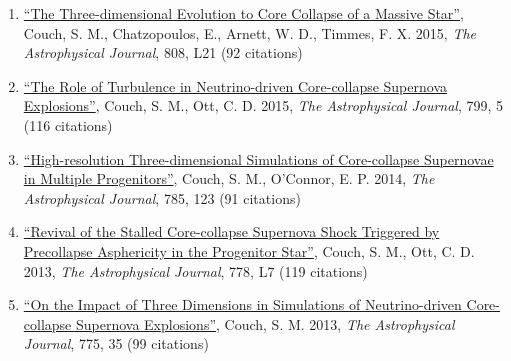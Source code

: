 \documentclass[12pt]{article}
\begin{document}
\begin{enumerate}
  \item \href{https://ui.adsabs.harvard.edu/#abs/2015ApJ...808L..21C/abstract}{``The Three-dimensional Evolution to Core Collapse of a Massive Star''}, Couch, S. M., Chatzopoulos, E., Arnett, W. D., Timmes, F. X. 2015, {\itshape The Astrophysical Journal}, 808, L21 (92 citations)
  
  \item \href{https://ui.adsabs.harvard.edu/#abs/2015ApJ...799....5C/abstract}{``The Role of Turbulence in Neutrino-driven Core-collapse Supernova Explosions''}, Couch, S. M., Ott, C. D. 2015, {\itshape The Astrophysical Journal}, 799, 5 (116 citations)

  \item \href{https://ui.adsabs.harvard.edu/#abs/2014ApJ...785..123C/abstract}{``High-resolution Three-dimensional Simulations of Core-collapse Supernovae in Multiple Progenitors''}, Couch, S. M., O'Connor, E. P. 2014, {\itshape The Astrophysical Journal}, 785, 123 (91 citations)

  \item \href{https://ui.adsabs.harvard.edu/#abs/2013ApJ...778L...7C/abstract}{``Revival of the Stalled Core-collapse Supernova Shock Triggered by Precollapse Asphericity in the Progenitor Star''}, Couch, S. M., Ott, C. D. 2013, {\itshape The Astrophysical Journal}, 778, L7 (119 citations)

  \item \href{https://ui.adsabs.harvard.edu/#abs/2013ApJ...775...35C/abstract}{``On the Impact of Three Dimensions in Simulations of Neutrino-driven Core-collapse Supernova Explosions''}, Couch, S. M. 2013, {\itshape The Astrophysical Journal}, 775, 35 (99 citations)

\end{enumerate}
\end{document}
